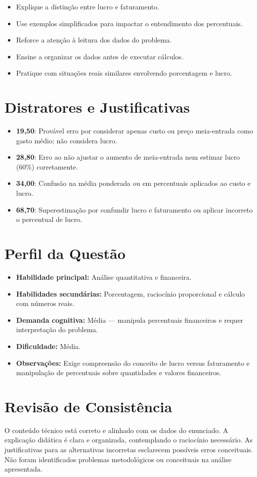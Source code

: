 \documentclass{article}
\begin{document}
\begin{itemize}
  \item Explique a distinção entre lucro e faturamento.
  \item Use exemplos simplificados para impactar o entendimento dos percentuais.
  \item Reforce a atenção à leitura dos dados do problema.
  \item Ensine a organizar os dados antes de executar cálculos.
  \item Pratique com situações reais similares envolvendo porcentagem e lucro.
\end{itemize}

\section*{Distratores e Justificativas}

\begin{itemize}
  \item \textbf{19,50}: Provável erro por considerar apenas custo ou preço meia-entrada como gasto médio; não considera lucro.
  \item \textbf{28,80}: Erro ao não ajustar o aumento de meia-entrada nem estimar lucro (60\%) corretamente.
  \item \textbf{34,00}: Confusão na média ponderada ou em percentuais aplicados ao custo e lucro.
  \item \textbf{68,70}: Superestimação por confundir lucro e faturamento ou aplicar incorreto o percentual de lucro.
\end{itemize}

\section*{Perfil da Questão}

\begin{itemize}
  \item \textbf{Habilidade principal:} Análise quantitativa e financeira.
  \item \textbf{Habilidades secundárias:} Porcentagem, raciocínio proporcional e cálculo com números reais.
  \item \textbf{Demanda cognitiva:} Média — manipula percentuais financeiros e requer interpretação do problema.
  \item \textbf{Dificuldade:} Média.
  \item \textbf{Observações:} Exige compreensão do conceito de lucro versus faturamento e manipulação de percentuais sobre quantidades e valores financeiros.
\end{itemize}

\section*{Revisão de Consistência}

O conteúdo técnico está correto e alinhado com os dados do enunciado. A explicação didática é clara e organizada, contemplando o raciocínio necessário. As justificativas para as alternativas incorretas esclarecem possíveis erros conceituais. Não foram identificados problemas metodológicos ou conceituais na análise apresentada.
\end{document}
